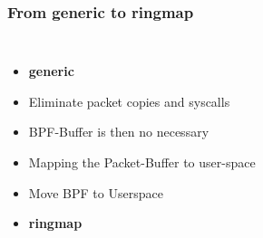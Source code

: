 \documentclass{beamer}
\begin{document}
\begin{frame}
\frametitle{From generic to ringmap}
\begin{columns}
\vspace{-1em}
\begin{itemize}
	\item<1->\textbf{generic}
	\item<2->Eliminate packet copies  and syscalls
	\item<3->BPF-Buffer is then no necessary
	\item<4->Mapping the Packet-Buffer to user-space
	\item<5->Move BPF to Userspace\newline
	\item<6->[$\Rightarrow$]\textbf{ringmap}
\end{itemize}
\vspace{-2em}

\end{columns}
\end{frame}
\end{document}

